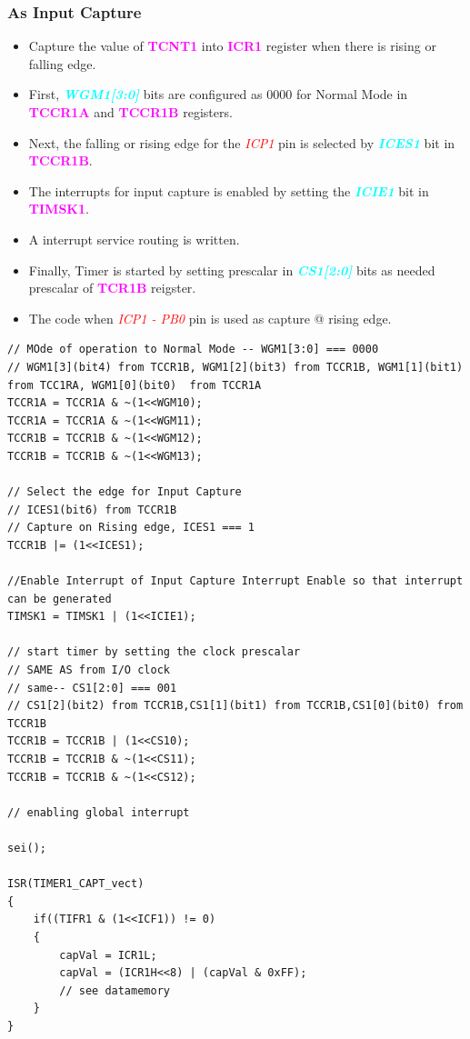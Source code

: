 \documentclass{article}
\newcommand{\bitFormat}[1]{\emph{\textbf{\textcolor{cyan}{#1}}}}
\newcommand{\regFormat}[1]{\textbf{\textcolor{magenta}{#1}}}
\newcommand{\pinFormat}[1]{\emph{\textcolor{red}{#1}}}
\begin{document}
\subsubsection{As Input Capture}
\begin{itemize}
    \item Capture the value of \regFormat{TCNT1} into \regFormat{ICR1} register when there is rising or falling edge.
    \item First, \bitFormat{WGM1[3:0]} bits are configured as 0000 for Normal Mode in \regFormat{TCCR1A} and \regFormat{TCCR1B} registers.
    \item Next, the falling or rising edge for the \pinFormat{ICP1} pin is selected by \bitFormat{ICES1} bit in \regFormat{TCCR1B}.
    \item The interrupts for input capture is enabled by setting the \bitFormat{ICIE1} bit in \regFormat{TIMSK1}.
    \item A interrupt service routing is written.
    \item Finally, Timer is started by setting prescalar in \bitFormat{CS1[2:0]} bits as needed prescalar of \regFormat{TCR1B} reigster.
    \item The code when \pinFormat{ICP1 - PB0} pin is used as capture @ rising edge.
\end{itemize}
\begin{verbatim}
// MOde of operation to Normal Mode -- WGM1[3:0] === 0000
// WGM1[3](bit4) from TCCR1B, WGM1[2](bit3) from TCCR1B, WGM1[1](bit1)  from TCC1RA, WGM1[0](bit0)  from TCCR1A	
TCCR1A = TCCR1A & ~(1<<WGM10);
TCCR1A = TCCR1A & ~(1<<WGM11);
TCCR1B = TCCR1B & ~(1<<WGM12);
TCCR1B = TCCR1B & ~(1<<WGM13);

// Select the edge for Input Capture
// ICES1(bit6) from TCCR1B
// Capture on Rising edge, ICES1 === 1
TCCR1B |= (1<<ICES1);

//Enable Interrupt of Input Capture Interrupt Enable so that interrupt can be generated
TIMSK1 = TIMSK1 | (1<<ICIE1);
    
// start timer by setting the clock prescalar
// SAME AS from I/O clock
// same-- CS1[2:0] === 001
// CS1[2](bit2) from TCCR1B,CS1[1](bit1) from TCCR1B,CS1[0](bit0) from TCCR1B
TCCR1B = TCCR1B | (1<<CS10);
TCCR1B = TCCR1B & ~(1<<CS11);
TCCR1B = TCCR1B & ~(1<<CS12);

// enabling global interrupt

sei();

ISR(TIMER1_CAPT_vect)
{
	if((TIFR1 & (1<<ICF1)) != 0)
	{
		capVal = ICR1L;
		capVal = (ICR1H<<8) | (capVal & 0xFF);
		// see datamemory
	}
}
\end{verbatim}
\end{document}
